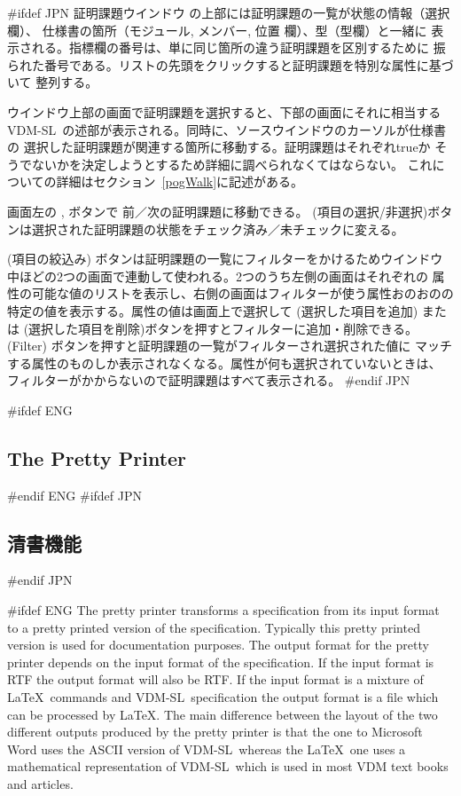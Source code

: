 \documentclass[\pformat,12pt]{article}
\newcommand{\vdmslpp}{VDM-SL}
\newcommand{\vdmslpp}{VDM++}
\newcommand{\guicmd}[1]{{\sf #1}}
\newcommand{\guicmd}[1]{{\gt #1}}
\begin{document}
#ifdef JPN
\guicmd{証明課題ウインドウ} の上部には証明課題の一覧が状態の情報（\guicmd{選択}欄）、
仕様書の箇所（\guicmd{モジュール}, \guicmd{メンバー}, \guicmd{位置} 欄）、型（\guicmd{型}欄）と一緒に
表示される。\guicmd{指標}欄の番号は、単に同じ箇所の違う証明課題を区別するために
振られた番号である。リストの先頭をクリックすると証明課題を特別な属性に基づいて
整列する。

ウインドウ上部の画面で証明課題を選択すると、下部の画面にそれに相当する
\vdmslpp\ の述部が表示される。同時に、ソースウインドウのカーソルが仕様書の
選択した証明課題が関連する箇所に移動する。証明課題はそれぞれtrueか
そうでないかを決定しようとするため詳細に調べられなくてはならない。
これについての詳細はセクション~\ref{pogWalk}に記述がある。

画面左の
 ,
 ボタンで
前／次の証明課題に移動できる。 
(\guicmd{項目の選択/非選択})ボタンは選択された証明課題の状態をチェック済み／未チェックに変える。

(\guicmd{項目の絞込み}) ボタンは証明課題の一覧にフィルターをかけるためウインドウ
中ほどの2つの画面で連動して使われる。2つのうち左側の画面はそれぞれの
属性の可能な値のリストを表示し、右側の画面はフィルターが使う属性おのおのの
特定の値を表示する。属性の値は画面上で選択して%
(\guicmd{選択した項目を追加}) または%
(\guicmd{選択した項目を削除})ボタンを押すとフィルターに追加・削除できる。 %
(\guicmd{Filter}) ボタンを押すと証明課題の一覧がフィルターされ選択された値に%
マッチする属性のものしか表示されなくなる。属性が何も選択されていないときは、%
フィルターがかからないので証明課題はすべて表示される。
#endif JPN

\newpage
#ifdef ENG
\subsection{The Pretty Printer}\label{sec:pp}
#endif ENG
#ifdef JPN
\subsection{清書機能}\label{sec:pp}
#endif JPN

#ifdef ENG
The pretty printer transforms a specification from its input format to
a pretty printed version of the specification. Typically this pretty
printed version is used for documentation purposes. The output format
for the pretty printer depends on the input format of the
specification. If the input format is RTF the output format will also
be RTF. If the input format is a mixture of \LaTeX\ commands and
\vdmslpp\ specification the output format is a file which can be processed
by \LaTeX. 
The main difference between the layout of the
two different outputs produced by the pretty printer is that the one
to Microsoft Word uses the ASCII version of \vdmslpp\ whereas the
\LaTeX\ one uses a mathematical representation of \vdmslpp\ which
is used in most VDM text books and articles.
\end{document}
